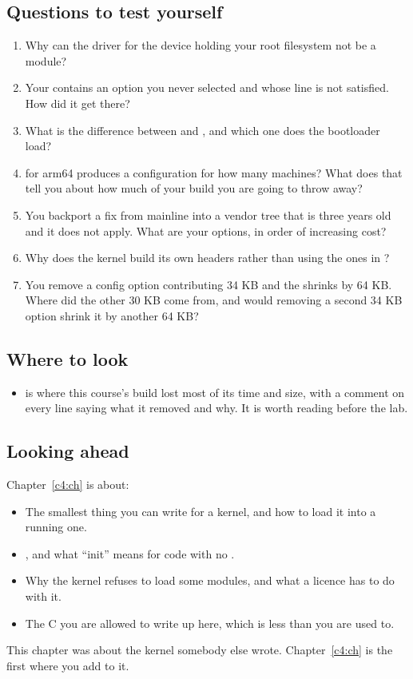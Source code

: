 \subsection*{Questions to test yourself}
\begin{enumerate}
  \item Why can the driver for the device holding your root filesystem not be a module?
  \item Your  contains an option you never selected and whose  line
    is not satisfied. How did it get there?
  \item What is the difference between  and , and which one does the
    bootloader load?
  \item {} for arm64 produces a configuration for how many machines? What does
    that tell you about how much of your build you are going to throw away?
  \item You backport a fix from mainline into a vendor tree that is three years old and it does not
    apply. What are your options, in order of increasing cost?
  \item Why does the kernel build its own headers rather than using the ones in ?
  \item You remove a config option contributing 34 KB and the  shrinks by 64 KB. Where
    did the other 30 KB come from, and would removing a second 34 KB option shrink it by another 64
    KB?
\end{enumerate}

\subsection*{Where to look}
\begin{itemize}
  \item {} is where this course's build lost most of its time and size, with
    a comment on every line saying what it removed and why. It is worth reading before the lab.
\end{itemize}

\subsection*{Looking ahead}
Chapter~\ref{c4:ch} is about:
\begin{itemize}
  \item The smallest thing you can write for a kernel, and how to load it into a running one.
  \item {}, and what ``init'' means for code with no .
  \item Why the kernel refuses to load some modules, and what a licence has to do with it.
  \item The C you are allowed to write up here, which is less than you are used to.
\end{itemize}
This chapter was about the kernel somebody else wrote. Chapter~\ref{c4:ch} is the first where you
add to it.
